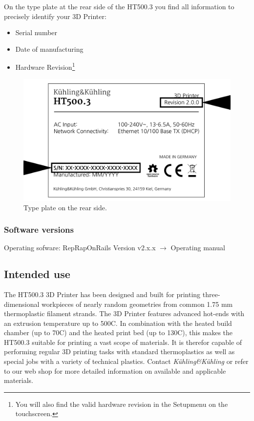  On the type plate at the rear side of the HT500.3 you find all information to precisely identify your 3D Printer:

\begin{itemize}
  \item Serial number
  \item Date of manufacturing
  \item Hardware Revision\footnote{You will also find the valid hardware revision in the \lbrack Setup\rbrack  menu on the touchscreen.}
\end{itemize}

\begin{figure}[H]
  \centering
  \includegraphics[width=.7\linewidth]{./img/type_plate_ht500-3.png}
  \caption{Type plate on the rear side.}
\end{figure}


\subsubsection{Software versions}

Operating sofware:
RepRapOnRails Version v2.x.x $\rightarrow$ Operating manual



\subsection{Intended use}

The HT500.3 3D Printer has been designed and built for printing three-dimensional workpieces of nearly random geometries from common 1.75 mm 
thermoplastic filament strands.
The 3D Printer features advanced hot-ends with an extrusion temperature up to 500\degree C. 
In combination with the heated build chamber (up to 70\degree C) and the heated print bed (up to 130\degree C), this makes the HT500.3 
suitable for printing a vast scope of materials. It is therefor capable of performing regular 3D printing tasks with standard thermoplastics
as well as special jobs with a variety of technical plastics.
Contact \emph{Kühling\&Kühling} or refer to our web shop for more detailed information on available and applicable materials.

